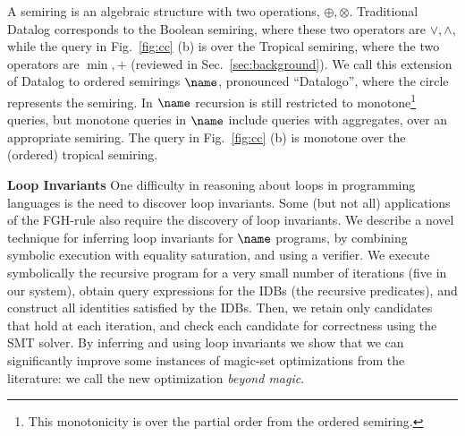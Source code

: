 A semiring is an
algebraic structure with two operations, $\oplus, \otimes$.
Traditional Datalog corresponds to the Boolean semiring, where these
two operators are $\vee, \wedge$, while the query in Fig.~\ref{fig:cc}
(b) is over the Tropical semiring, where the two operators are
$\min, +$ (reviewed in Sec.~\ref{sec:background}).
We call this extension of Datalog to ordered semirings $\name$,
pronounced ``Datalogo'', where the circle represents
the semiring.  In $\name$ recursion is still restricted to monotone\footnote{This
monotonicity is over the partial order from the ordered semiring.}
queries, but monotone queries in $\name$ include queries with aggregates, over an
appropriate semiring.  The query in Fig.~\ref{fig:cc} (b) is monotone
over the (ordered) tropical semiring.

{\bf Loop Invariants} One difficulty in reasoning about loops in
programming languages is the need to discover loop invariants.  Some
(but not all) applications of the FGH-rule also require the discovery
of loop invariants.  We describe a novel technique for inferring loop
invariants for $\name$ programs, by combining symbolic execution with
equality saturation, and using a verifier.  We execute symbolically
the recursive program for a very small number of iterations (five in
our system), obtain query expressions for the IDBs (the recursive
predicates), and construct all identities satisfied by the IDBs.
Then, we retain only candidates that hold at each iteration, and check
each candidate for correctness using the SMT solver.  By inferring and
using loop invariants we show that we can significantly improve some
instances of magic-set optimizations from the literature: we call the
new optimization {\em beyond magic}.







